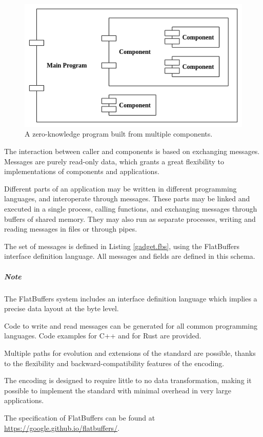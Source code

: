 \begin{figure}[!h]
	\centering
	\includegraphics[width=0.7\linewidth]{graphics/program_components.png}
	\caption{A zero-knowledge program built from multiple components.}
	\label{program_components}
\end{figure}



	The interaction between caller and components is based on exchanging messages.
	Messages are purely read-only data, which grants a great flexibility to
	implementations of components and applications.

	Different parts of an application may be written in different programming languages, and interoperate through messages.
	These parts may be linked and executed in a single process, calling functions,
	and exchanging messages through buffers of shared memory.
	They may also run as separate processes, writing and reading messages in files or through pipes.

	The set of messages is defined in Listing \ref{gadget.fbs}, 
	using the FlatBuffers interface definition language.
	All messages and fields are defined in this schema.

	\subparagraph{Note}
	The FlatBuffers system includes an interface definition language
	which implies a precise data layout at the byte level.

	Code to write and read messages can be generated for all common programming languages. Code examples for C++ and for Rust are provided.

	Multiple paths for evolution and extensions of the standard are possible,
	thanks to the flexibility and backward-compatibility features of the encoding.

	The encoding is designed to require little to no data transformation, making it possible to implement the standard with minimal overhead in very large applications.

	The specification of FlatBuffers can be found at
	\href{https://google.github.io/flatbuffers/}{https://google.github.io/flatbuffers/}.

